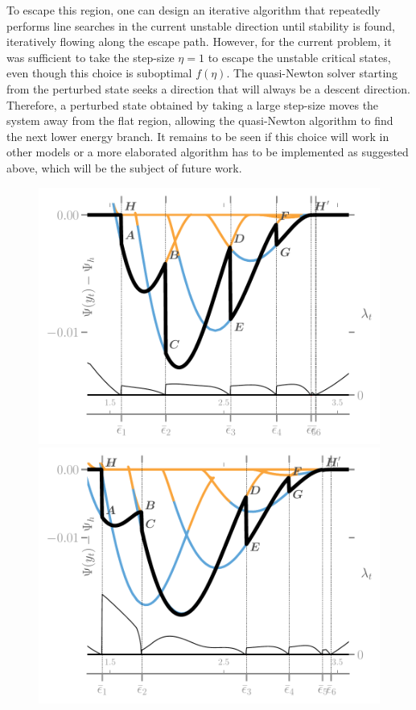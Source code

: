 To escape this region, one can design an iterative algorithm that repeatedly performs line searches in the current unstable direction until stability is found, iteratively flowing along the escape path. However, for the current problem, it was sufficient to take the step-size \( \eta=1 \) to escape the unstable critical states, even though this choice is suboptimal  \( f(\eta) \). 
The quasi-Newton solver starting from the perturbed state seeks a direction that will always be a descent direction. Therefore, a perturbed state obtained by taking a large step-size moves the system away from the flat region, allowing the quasi-Newton algorithm to find the next lower energy branch. It remains to be seen if this choice will work in other models or a more elaborated algorithm has to be implemented as suggested above, which will be the subject of future work.
\begin{figure}
    \includegraphics[width=.7\textwidth]{../images/model_stiff_energy_kick_algo.pdf} \\
    \includegraphics[width=.7\textwidth]{../images/model_compliant_energy_kick_algo.pdf}
    \caption{
        }
    \label{fig:tempo2}
\end{figure}


